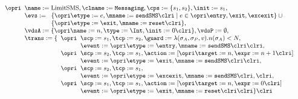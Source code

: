 \[
\small{
\hspace{-0.3em}
\begin{array}[t]{l}
\opri
\begin{array}[t]{l}
\name := \textrm{LimitSMS}, \clname := \texttt{Messaging},
\cps := \{s_1, s_2\},
\init := s_1,\\
\evs :=
\begin{array}[t]{l}
\{ \opri \etype := e, \mname := \texttt{sendSMS} \clri \mid e \in \opri \entry,
\exit, \excexit \} \:\cup \\
\{ \opri \etype := \exit, \mname := \texttt{reset} \clri\},
\end{array}
\\
\vdsA := \{\opri \name := n, \type := \Int, \init := 0 \clri\},
\vdsP := \emptyset,\\
\trans := \{
\begin{array}[t]{l}
\opri
 \begin{array}[t]{l}
\scp := s_1, \tcp := s_2, \guard := \lambda(\sigma_A, \sigma_P, v). n(\sigma_A) < N,\\
             \event := \opri \etype := \entry,
                             \mname := \texttt{sendSMS} \clri \clri,
\end{array}\\
\opri
 \begin{array}[t]{l}
\scp := s_2, \tcp := s_1, \action := [\opri \target := n, \expr := n + 1 \clri]\\
             \event := \opri \etype := \exit,
                             \mname := \texttt{sendSMS} \clri \clri,
\end{array}\\
\opri
 \begin{array}[t]{l}
\scp := s_2, \tcp := s_1, \\
             \event := \opri \etype := \excexit,
                             \mname := \texttt{sendSMS} \clri, \clri,
\end{array}\\
\opri
\begin{array}[t]{l}
\scp := s_1, \tcp := s_1, \action := [\opri \target := n, \expr := 0 \clri] \\
             \event := \opri \etype := \exit, \mname := \texttt{reset} \clri \clri
\} \clri
\end{array}
\end{array}
\end{array}\\
\end{array}
}\]


